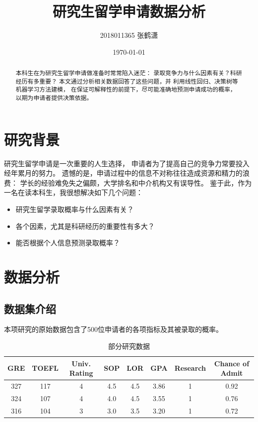 \documentclass[12pt, UTF8, a4paper]{ctexart}
\title{研究生留学申请数据分析}
\author{2018011365 张鹤潇}
\date{\today}
\begin{document}
\begin{titlepage}
    
\maketitle

\begin{abstract}
    本科生在为研究生留学申请做准备时常常陷入迷茫：
    录取竞争力与什么因素有关？科研经历有多重要？
    本文通过分析相关数据回答了这些问题，并
    利用线性回归、决策树等机器学习方法建模，
    在保证可解释性的前提下，尽可能准确地预测申请成功的概率，
    以期为申请者提供决策依据。
\end{abstract}
\tableofcontents

\thispagestyle{empty}
\end{titlepage}

\setcounter{page}{1}

\section{研究背景}

研究生留学申请是一次重要的人生选择，
申请者为了提高自己的竞争力常要投入经年累月的努力。
遗憾的是，申请过程中的信息不对称往往造成资源和精力的浪费：
学长的经验难免失之偏颇，大学排名和中介机构又有误导性。
鉴于此，作为一名在读本科生，我很想解决如下几个问题：
\begin{itemize}
    \item 研究生留学录取概率与什么因素有关？
    \item 各个因素，尤其是科研经历的重要性有多大？
    \item 能否根据个人信息预测录取概率？
\end{itemize}

\section{数据分析}

\subsection{数据集介绍}

本项研究的原始数据包含了500位申请者的各项指标及其被录取的概率。

\begin{table}[htbp] 
    \caption{\label{tab:1}部分研究数据} 
    \centering
    \small
    \begin{tabular}{cccccccc} 
     \toprule 
     GRE & TOEFL & Univ. Rating & SOP & LOR & GPA & Research & Chance of Admit \\ 
     \midrule 
    327 & 117 & 4 & 4.5 & 4.5 & 3.86 & 1 & 0.92\\
    324 & 107 & 4 & 4.0 & 4.5 & 3.55 & 1 & 0.76\\
    316 & 104 & 3 & 3.0 & 3.5 & 3.20 & 1 & 0.72\\
     \bottomrule 
    \end{tabular}
\end{table}
\end{document}
